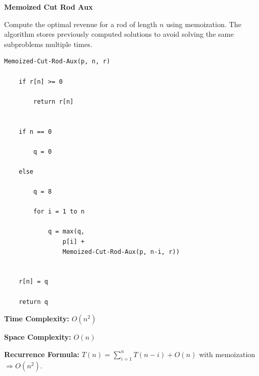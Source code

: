 \documentclass[a4paper,12pt]{article}
\begin{document}
\begin{tcolorbox}[
    colback=gray!30,
    colframe=black,
    boxrule=1pt,
    arc=0mm
]

\begin{tcolorbox}[
    colback=gray!10,
    colframe=black,
    arc=0mm
]
\centering
{\Huge\bfseries Memoized Cut Rod Aux}
\end{tcolorbox}


\begin{tcolorbox}[
    colback=gray!10,
    colframe=black,
    arc=0mm
]
\small
Compute the optimal revenue for a rod of length $n$ using memoization.
The algorithm stores previously computed solutions to avoid solving the same
subproblems multiple times.
\end{tcolorbox}


\begin{tcolorbox}[
    colback=black!5,
    colframe=black,
    arc=0mm,
    title=Pseudo-code
]
\tiny
\begin{lstlisting}
Memoized-Cut-Rod-Aux(p, n, r)

    if r[n] >= 0

        return r[n]


    if n == 0

        q = 0

    else

        q = 8

        for i = 1 to n

            q = max(q,
                p[i] +
                Memoized-Cut-Rod-Aux(p, n-i, r))


    r[n] = q

    return q
\end{lstlisting}
\end{tcolorbox}


\begin{tcolorbox}[
    colback=cyan!20,
    colframe=black,
    arc=0mm
]
\small
\textbf{Time Complexity:}
$O(n^2)$
\end{tcolorbox}


\begin{tcolorbox}[
    colback=violet!20,
    colframe=black,
    arc=0mm
]
\small
\textbf{Space Complexity:}
$O(n)$
\end{tcolorbox}


\begin{tcolorbox}[
    colback=pink!20,
    colframe=black,
    arc=0mm
]
\small
\textbf{Recurrence Formula:}
$T(n)=\sum_{i=1}^{n}T(n-i)+O(n)$
with memoization $\Rightarrow O(n^2)$.
\end{tcolorbox}

\end{tcolorbox}
\end{document}
